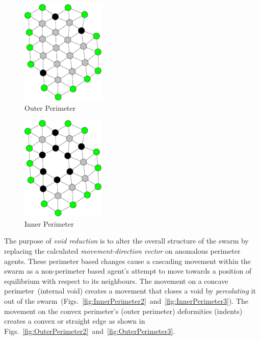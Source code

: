 \documentclass[preprint,12pt]{elsarticle}
\begin{document}
\begin{figure}
\begin{center}
\includegraphics[width=4cm]{figures/OuterPerimeter1}
\end{center}
\caption{Outer Perimeter\label{fig:OuterPerimeter1}}
\end{figure}

\begin{figure}
\begin{center}
\includegraphics[width=4cm]{figures/InnerPerimeter1}
\end{center}
\caption{Inner Perimeter\label{fig:InnerPerimeter1}}
\end{figure}

The purpose of \textit{void reduction} is to alter the overall structure of the swarm by replacing the calculated \textit{movement-direction vector} on anomalous perimeter agents. These perimeter based changes cause a cascading movement within the swarm as a non-perimeter based agent's attempt to move towards a position of equilibrium with respect to its neighbours. The movement on a concave perimeter~(internal void) creates a movement that closes a void by \textit{percolating} it out of the swarm~(Figs.~\ref{fig:InnerPerimeter2}~and~\ref{fig:InnerPerimeter3}). The movement on the convex perimeter's (outer perimeter) deformities (indents) creates a convex or straight edge as shown in Figs.~\ref{fig:OuterPerimeter2}~and~\ref{fig:OuterPerimeter3}.
\end{document}
